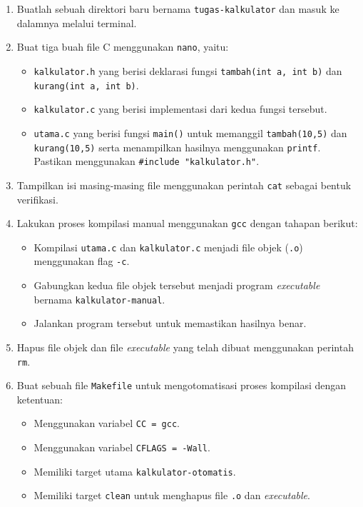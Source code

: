 \begin{enumerate}
    \item Buatlah sebuah direktori baru bernama \texttt{tugas-kalkulator} dan masuk ke dalamnya melalui terminal.
    
    \item Buat tiga buah file C menggunakan \texttt{nano}, yaitu:
    \begin{itemize}
        \item \texttt{kalkulator.h} yang berisi deklarasi fungsi \texttt{tambah(int a, int b)} dan \texttt{kurang(int a, int b)}.
        \item \texttt{kalkulator.c} yang berisi implementasi dari kedua fungsi tersebut.
        \item \texttt{utama.c} yang berisi fungsi \texttt{main()} untuk memanggil \texttt{tambah(10,5)} dan \texttt{kurang(10,5)} serta menampilkan hasilnya menggunakan \texttt{printf}. Pastikan menggunakan \texttt{\#include "kalkulator.h"}.
    \end{itemize}

    \item Tampilkan isi masing-masing file menggunakan perintah \texttt{cat} sebagai bentuk verifikasi.

    \item Lakukan proses kompilasi manual menggunakan \texttt{gcc} dengan tahapan berikut:
    \begin{itemize}
        \item Kompilasi \texttt{utama.c} dan \texttt{kalkulator.c} menjadi file objek (\texttt{.o}) menggunakan flag \texttt{-c}.
        \item Gabungkan kedua file objek tersebut menjadi program \textit{executable} bernama \texttt{kalkulator-manual}.
        \item Jalankan program tersebut untuk memastikan hasilnya benar.
    \end{itemize}

    \item Hapus file objek dan file \textit{executable} yang telah dibuat menggunakan perintah \texttt{rm}.

    \item Buat sebuah file \texttt{Makefile} untuk mengotomatisasi proses kompilasi dengan ketentuan:
    \begin{itemize}
        \item Menggunakan variabel \texttt{CC = gcc}.
        \item Menggunakan variabel \texttt{CFLAGS = -Wall}.
        \item Memiliki target utama \texttt{kalkulator-otomatis}.
        \item Memiliki target \texttt{clean} untuk menghapus file \texttt{.o} dan \textit{executable}.
    \end{itemize}


\end{enumerate}
